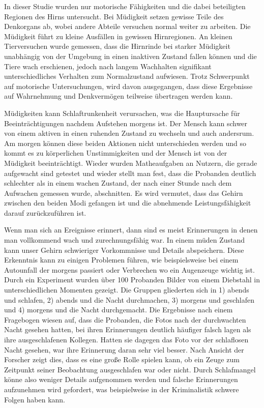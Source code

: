 \cite{online:uebermuedetesHirn}

In dieser Studie wurden nur motorische Fähigkeiten und die dabei beteiligten Regionen des Hirns untersucht. Bei Müdigkeit setzen gewisse Teile des Denkorgans ab, wobei andere Abteile versuchen normal weiter zu arbeiten. Die Müdigkeit führt zu kleine Ausfällen in gewissen Hirnregionen. An kleinen Tierversuchen wurde gemessen, dass die Hirnrinde bei starker Müdigkeit unabhängig von der Umgebung in einen inaktiven Zustand fallen können und die Tiere wach erschienen, jedoch nach langem Wachhalten signifikant unterschiedliches Verhalten zum Normalzustand aufwiesen. Trotz Schwerpunkt auf motorische Untersuchungen, wird davon ausgegangen, dass diese Ergebnisse auf Wahrnehmung und Denkvermögen teilweise übertragen werden kann.\\

\cite{online:muede}

Müdigkeiten kann Schlaftrunkenheit verursachen, was die Hauptursache für Beeinträchtigungen nachdem Aufstehen morgens ist. Der Mensch kann schwer von einem aktiven in einen ruhenden Zustand zu wechseln und auch andersrum. Am morgen können diese beiden Aktionen nicht unterschieden werden und so kommt es zu körperlichen Unstimmigkeiten und der Mensch ist von der Müdigkeit beeinträchtigt. Wieder wurden Matheaufgaben an Nutzern, die gerade aufgewacht sind getestet und wieder stellt man fest, dass die Probanden deutlich schlechter als in einem wachen Zustand, der nach einer Stunde nach dem Aufwachen gemessen wurde, abschnitten. Es wird vermutet, dass das Gehirn zwischen den beiden Modi gefangen ist und die abnehmende Leistungsfähigkeit darauf zurückzuführen ist.\\

\cite{online:streiche}

Wenn man sich an Ereignisse erinnert, dann sind es meist Erinnerungen in denen man vollkommend wach und zurechnungsfähig war. In einem müden Zustand kann unser Gehirn schwieriger Vorkommnisse und Details abspeichern. Diese Erkenntnis kann zu einigen Problemen führen, wie beispielsweise bei einem Autounfall der morgens passiert oder Verbrechen wo ein Augenzeuge wichtig ist. Durch ein Experiment wurden über 100 Probanden Bilder von einem Diebstahl in unterschiedlichen Momenten gezeigt. Die Gruppen gliederten sich in 1) abends und schlafen, 2) abends und die Nacht durchmachen, 3) morgens und geschlafen und 4) morgens und die Nacht durchgemacht. Die Ergebnisse nach einem Fragebogen wiesen auf, dass die Probanden, die Fotos nach der durchwachten Nacht gesehen hatten, bei ihren Erinnerungen deutlich häufiger falsch lagen als ihre ausgeschlafenen Kollegen. Hatten sie dagegen das Foto vor der schlaflosen Nacht gesehen, war ihre Erinnerung daran sehr viel besser. Nach Ansicht der Forscher zeigt dies, dass es eine große Rolle spielen kann, ob ein Zeuge zum Zeitpunkt seiner Beobachtung ausgeschlafen war oder nicht. Durch Schlafmangel könne also weniger Details aufgenommen werden und falsche Erinnerungen aufzunehmen wird gefordert, was beispielweise in der Kriminalistik schwere Folgen haben kann.\\



